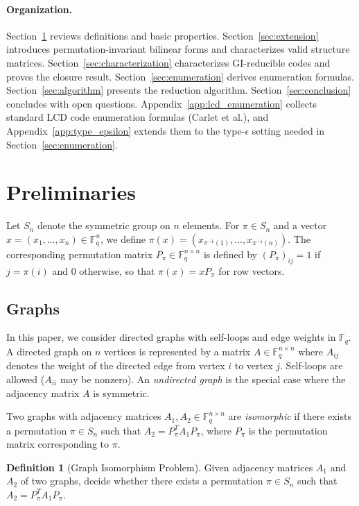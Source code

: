 \documentclass[11pt]{article}
\newcommand{\FF}{\mathbb{F}}
\newcommand{\0}{\mathbf{0}}
\newcommand{\1}{\mathbf{1}}
\theoremstyle{plain}
\theoremstyle{definition}
\newtheorem{definition}[theorem]{Definition}
\theoremstyle{remark}
\begin{document}
\paragraph{Organization.}
Section~\ref{sec:preliminaries} reviews definitions and basic properties.
Section~\ref{sec:extension} introduces permutation-invariant bilinear forms and characterizes valid structure matrices.
Section~\ref{sec:characterization} characterizes GI-reducible codes and proves the closure result.
Section~\ref{sec:enumeration} derives enumeration formulas.
Section~\ref{sec:algorithm} presents the reduction algorithm.
Section~\ref{sec:conclusion} concludes with open questions.
Appendix~\ref{app:lcd_enumeration} collects standard LCD code enumeration formulas (Carlet et al.), and Appendix~\ref{app:type_epsilon} extends them to the type-$\epsilon$ setting needed in Section~\ref{sec:enumeration}.


\section{Preliminaries}
\label{sec:preliminaries}

Let $S_n$ denote the symmetric group on $n$ elements. For $\pi \in S_n$ and a vector $x = (x_1, \ldots, x_n) \in \FF_q^n$, we define $\pi(x) = (x_{\pi^{-1}(1)}, \ldots, x_{\pi^{-1}(n)})$. The corresponding permutation matrix $P_\pi \in \FF_q^{n \times n}$ is defined by $(P_\pi)_{ij} = 1$ if $j = \pi(i)$ and $0$ otherwise, so that $\pi(x) = xP_\pi$ for row vectors.

\subsection{Graphs}

In this paper, we consider directed graphs with self-loops and edge weights in $\FF_q$. A directed graph on $n$ vertices is represented by a matrix $A \in \FF_q^{n \times n}$ where $A_{ij}$ denotes the weight of the directed edge from vertex $i$ to vertex $j$. Self-loops are allowed ($A_{ii}$ may be nonzero). An \emph{undirected graph} is the special case where the adjacency matrix $A$ is symmetric.

Two graphs with adjacency matrices $A_1, A_2 \in \FF_q^{n \times n}$ are \emph{isomorphic} if there exists a permutation $\pi \in S_n$ such that $A_2 = P_\pi^T A_1 P_\pi$, where $P_\pi$ is the permutation matrix corresponding to $\pi$.

\begin{definition}[Graph Isomorphism Problem]
Given adjacency matrices $A_1$ and $A_2$ of two graphs, decide whether there exists a permutation $\pi \in S_n$ such that $A_2 = P_\pi^T A_1 P_\pi$.
\end{definition}
\end{document}
